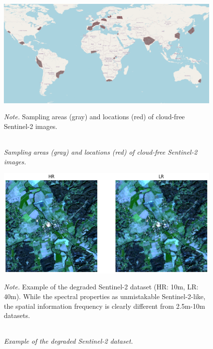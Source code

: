 \begin{figure}[H] 
    \caption{\doublespacing \\ \textit{Sampling areas (gray) and locations (red) of cloud-free Sentinel-2 images.}} 
    \centering
    \includegraphics[width=1\linewidth]{images/sampling_locations.png}
    \begin{justify}
        \textit{Note.} Sampling areas (gray) and locations (red) of cloud-free Sentinel-2 images.
    \end{justify}                    
    \label{fig:sampling_sites}
\end{figure}

\begin{figure}[H] 
    \caption{\doublespacing \\ \textit{Example of the degraded Sentinel-2 dataset.}} 
    \centering
    \includegraphics[width=1\linewidth]{images/sen2_degr.png}
    \begin{justify}
        \textit{Note.} Example of the degraded Sentinel-2 dataset (HR: 10m, LR: 40m). While the spectral properties as unmistakable Sentinel-2-like, the spatial information frequency is clearly different from 2.5m-10m datasets.
    \end{justify}                    
    \label{fig:sen2_degraded}
\end{figure}


